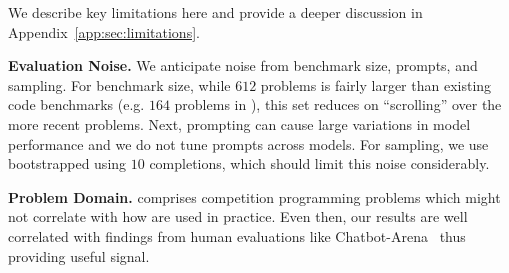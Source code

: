 We describe key limitations here and provide a deeper discussion in Appendix~\ref{app:sec:limitations}.

\noindent \textbf{Evaluation Noise.}
We anticipate noise from benchmark size, prompts, and sampling.
For benchmark size, while $612$ problems is fairly larger than existing code benchmarks (e.g. $164$ problems in \humaneval{}), this set reduces on ``scrolling'' over the more recent problems. 
Next, prompting can cause large variations in model performance and we do not tune prompts across models. %
For sampling, we use bootstrapped  using $10$ completions, which should limit this noise considerably.

\textbf{Problem Domain.} \livecodebench{} comprises competition programming problems which might not correlate with how \llms{} are used in practice. 
Even then, our results are well correlated with findings from human evaluations like Chatbot-Arena~\cite{chiang2024chatbot} thus providing useful signal.